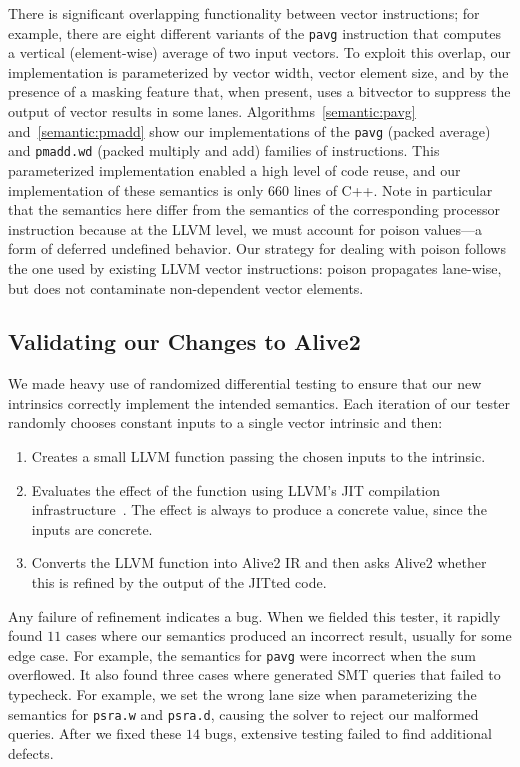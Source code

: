 There is significant overlapping functionality between vector
instructions; for example, there are eight different variants of the
\texttt{pavg} instruction that computes a vertical (element-wise)
average of two input vectors.
%
To exploit this overlap, our implementation is parameterized by vector
width, vector element size, and by the presence of a masking feature
that, when present, uses a bitvector to suppress the output of vector
results in some lanes.
%
Algorithms~\ref{semantic:pavg} and~\ref{semantic:pmadd} show our
implementations of the \texttt{pavg} (packed average) and
\texttt{pmadd.wd} (packed multiply and add) families of instructions.
%
This parameterized implementation enabled a high level of code reuse,
and our implementation of these semantics is only 660 lines of C++.
%
Note in particular that the semantics here differ from the semantics of
the corresponding processor instruction because at the LLVM level, we
must account for poison values---a form of deferred undefined
behavior.
%
Our strategy for dealing with poison follows the one used by existing
LLVM vector instructions: poison propagates lane-wise, but does not
contaminate non-dependent vector elements.


\subsection{Validating our Changes to Alive2}

We made heavy use of randomized differential testing to ensure that
our new intrinsics correctly implement the intended semantics.
%
Each iteration of our tester randomly chooses constant inputs to a
single vector intrinsic and then:
%
\begin{enumerate}
\item
  Creates a small LLVM function passing the chosen inputs to the
  intrinsic.
\item
  Evaluates the effect of the function using LLVM's JIT compilation
  infrastructure~\cite{orc}. The effect is always to produce a
  concrete value, since the inputs are concrete.
\item
  Converts the LLVM function into Alive2 IR and then asks Alive2
  whether this is refined by the output of the JITted code.
\end{enumerate}
%
Any failure of refinement indicates a bug.
%
When we fielded this tester, it rapidly found $11$ cases
where our semantics produced an incorrect result, usually for
some edge case.
%
For example, the semantics for \texttt{pavg} were incorrect when the
sum overflowed.
%
It also found three cases where \minotaur{} generated SMT queries that
failed to typecheck.
%
For example, we set the wrong lane size when parameterizing the
semantics for \texttt{psra.w} and \texttt{psra.d}, causing the solver
to reject our malformed queries.
%
After we fixed these $14$ bugs, extensive testing failed to find
additional defects.


